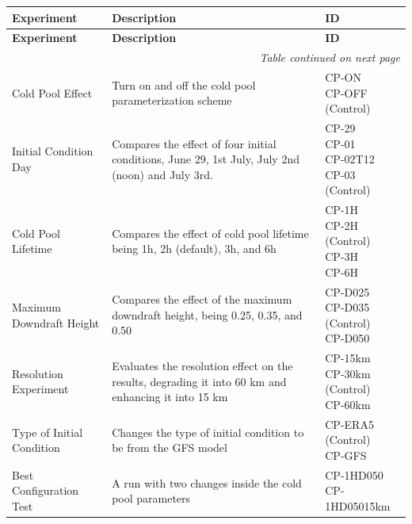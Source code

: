 \begin{longtable}{m{3cm} m{8cm} m{3.5cm}}
\textbf{Experiment} & \textbf{Description} & \textbf{ID} \\
\hline
\endfirsthead

\textbf{Experiment} & \textbf{Description} & \textbf{ID} \\
\hline
\endhead

\multicolumn{3}{r}{\textit{Table continued on next page}} \\
\endfoot

\hline
\endlastfoot

Cold Pool Effect & Turn on and off the cold pool parameterization scheme & \makecell[l]{CP-ON\\CP-OFF (Control)} \\
\hline
Initial Condition Day & Compares the effect of four initial conditions, June 29, 1st July, July 2nd (noon) and July 3rd. & \makecell[l]{CP-29\\CP-01\\CP-02T12\\CP-03 (Control)} \\
\hline
Cold Pool Lifetime & Compares the effect of cold pool lifetime being 1h, 2h (default), 3h, and 6h & \makecell[l]{CP-1H\\CP-2H (Control)\\CP-3H\\CP-6H} \\
\hline
Maximum Downdraft Height & Compares the effect of the maximum downdraft height, being 0.25, 0.35, and 0.50 & \makecell[l]{CP-D025\\CP-D035 (Control)\\CP-D050} \\
\hline
Resolution Experiment & Evaluates the resolution effect on the results, degrading it into 60 km and enhancing it into 15 km & \makecell[l]{CP-15km\\CP-30km (Control)\\CP-60km} \\
\hline
Type of Initial Condition & Changes the type of initial condition to be from the GFS model & \makecell[l]{CP-ERA5 (Control)\\CP-GFS} \\
\hline
Best Configuration Test & A run with two changes inside the cold pool parameters & \makecell[l]{CP-1HD050\\CP-1HD05015km} \\
\end{longtable}

